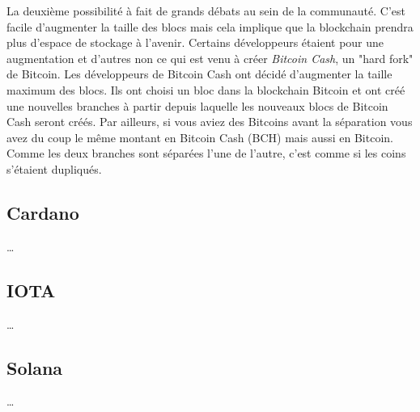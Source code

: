 \documentclass[../tb_report.tex]{subfiles}
\begin{document}
La deuxième possibilité à fait de grands débats au sein de la communauté. C'est facile d'augmenter la taille des blocs mais cela implique que la blockchain prendra plus d'espace de stockage à l'avenir. Certains développeurs étaient pour une augmentation et d'autres non ce qui est venu à créer \emph{Bitcoin Cash}, un "hard fork" de Bitcoin. Les développeurs de Bitcoin Cash ont décidé d'augmenter la taille maximum des blocs. Ils ont choisi un bloc dans la blockchain Bitcoin et ont créé une nouvelles branches à partir depuis laquelle les nouveaux blocs de Bitcoin Cash seront créés. Par ailleurs, si vous aviez des Bitcoins avant la séparation vous avez du coup le même montant en Bitcoin Cash (BCH) mais aussi en Bitcoin. Comme les deux branches sont séparées l'une de l'autre, c'est comme si les coins s'étaient dupliqués.

\subsection{Cardano}

\dots

\subsection{IOTA}

\dots

\subsection{Solana}

\dots
\end{document}
